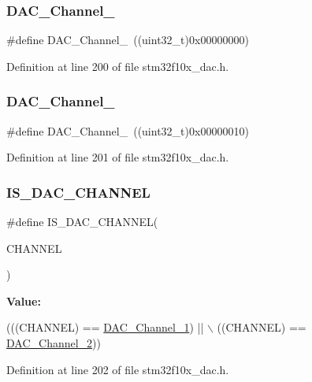 \subsubsection{\texorpdfstring{D\+A\+C\+\_\+\+Channel\+\_}{DAC\_Channel\_1}}
{\footnotesize\ttfamily \#define D\+A\+C\+\_\+\+Channel\+\_~((uint32\+\_\+t)0x00000000)}



Definition at line 200 of file stm32f10x\+\_\+dac.\+h.

\mbox{\label{group___d_a_c___channel__selection_ga0e9b0096866bb06e8a82b3e4e66943bb}} 
\subsubsection{\texorpdfstring{D\+A\+C\+\_\+\+Channel\+\_}{DAC\_Channel\_2}}
{\footnotesize\ttfamily \#define D\+A\+C\+\_\+\+Channel\+\_~((uint32\+\_\+t)0x00000010)}



Definition at line 201 of file stm32f10x\+\_\+dac.\+h.

\mbox{\label{group___d_a_c___channel__selection_gafb2b9bdaccb3a5e3396925d7cba02cc3}} 
\subsubsection{\texorpdfstring{I\+S\+\_\+\+D\+A\+C\+\_\+\+C\+H\+A\+N\+N\+EL}{IS\_DAC\_CHANNEL}}
{\footnotesize\ttfamily \#define I\+S\+\_\+\+D\+A\+C\+\_\+\+C\+H\+A\+N\+N\+EL(\begin{DoxyParamCaption}\item[{}]{C\+H\+A\+N\+N\+EL }\end{DoxyParamCaption})}

{\bfseries Value\+:}
\begin{DoxyCode}
(((CHANNEL) == \hyperlink{group___d_a_c___channel__selection_gacf6585474ed2a302b69a3725daa91555}{DAC\_Channel\_1}) || \(\backslash\)
                                 ((CHANNEL) == \hyperlink{group___d_a_c___channel__selection_ga0e9b0096866bb06e8a82b3e4e66943bb}{DAC\_Channel\_2}))
\end{DoxyCode}


Definition at line 202 of file stm32f10x\+\_\+dac.\+h.

